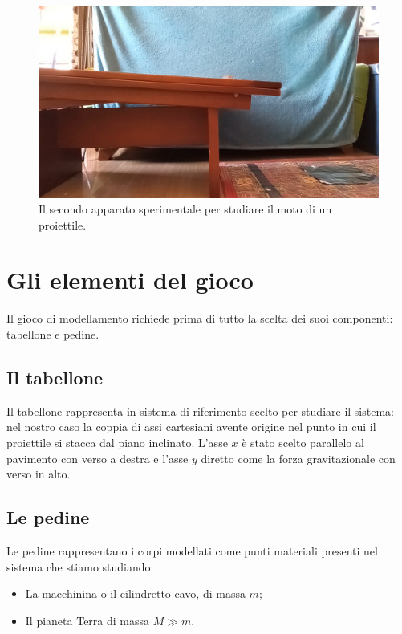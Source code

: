\documentclass{article}
\begin{document}
\begin{figure}
\centering
  \includegraphics[width=\textwidth]{setup_proiettile_piano_inclinato_2}
  \caption{Il secondo apparato sperimentale per studiare il moto di un proiettile.}
  \label{fig:setup_proiettile_2}
\end{figure}


\section{Gli elementi del gioco}
Il gioco di modellamento richiede prima di tutto la scelta
dei suoi componenti: tabellone e pedine.

\subsection{Il tabellone}
Il tabellone rappresenta in sistema di riferimento scelto per studiare
il sistema: nel nostro caso la coppia di assi cartesiani avente
origine nel punto in cui il proiettile si stacca dal
piano inclinato. L'asse $x$ è stato scelto parallelo al pavimento
con verso a destra e l'asse $y$ diretto come la forza gravitazionale
con verso in alto.

\subsection{Le pedine}
Le pedine rappresentano i corpi modellati come punti materiali
presenti nel sistema che stiamo studiando:

\begin{itemize}
\item La macchinina o il cilindretto cavo, di massa $m$;
\item Il pianeta Terra di massa $M \gg m$.
\end{itemize}
\end{document}
